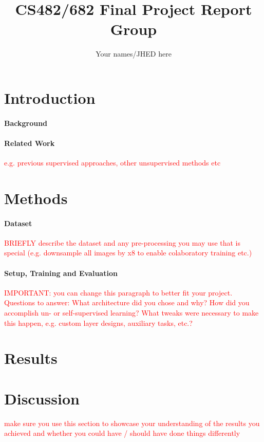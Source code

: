 \documentclass[twocolumn]{article}
\title{CS482/682 Final Project Report Group \todo{XX}\\
	\large \todo{your project title here}}
\author{Your names/JHED here}
\date{}
\newcommand{\todo}[1]{\textcolor{red}{#1}}
\begin{document}
	
	\maketitle
	
	\section{Introduction}
	\paragraph{Background} 
	\paragraph{Related Work} \todo{e.g. previous supervised approaches, other unsupervised methods etc}
	
	\section{Methods}
	\paragraph{Dataset} \todo{BRIEFLY describe the dataset and any pre-processing you may use that is special (e.g. downsample all images by x8 to enable colaboratory training etc.)}
	
	\paragraph{Setup, Training and Evaluation} \todo{IMPORTANT: you can change this paragraph to better fit your project. Questions to answer: What architecture did you chose and why? How did you accomplish un- or self-supervised learning? What tweaks were necessary to make this happen, e.g. custom layer designs, auxiliary tasks, etc.?}
	
	
	
	\section{Results}
	
	
	\section{Discussion} \todo{make sure you use this section to showcase your understanding of the results you achieved and whether you could have / should have done things differently }
\end{document}
